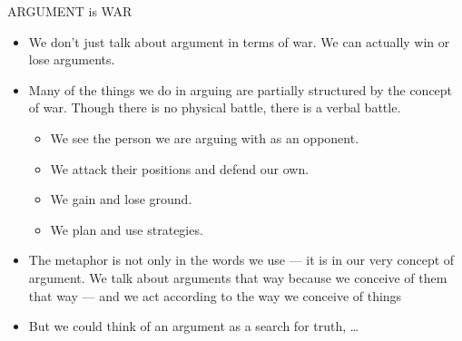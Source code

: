 \begin{frame}[allowframebreaks]{ARGUMENT is WAR}

\begin{exe}
\ex {}
\ex {}
\ex {}
\ex {}
\ex {}
\ex {}
\ex {}
\ex {}
\ex {}
\end{exe}
\framebreak
\begin{itemize}
\item We don't just talk about argument in terms of war. We can actually win or
lose arguments.
\item  Many of the things we do in arguing are partially structured by the concept of war.
Though there is no physical battle, there is a verbal battle.
\begin{itemize}
  \item  We see the person we are arguing with as an opponent.
  \item  We attack their positions and defend our own.
  \item  We gain and lose ground.
  \item  We plan and use strategies.
 \end{itemize}

\item The metaphor is not only in the words we use --- it is in our very concept of argument.  We talk about arguments that way because we conceive of them that way --- and we
act according to the way we conceive of things
\item But we could think of an argument as a search for truth, \ldots
\end{itemize}

\end{frame}

